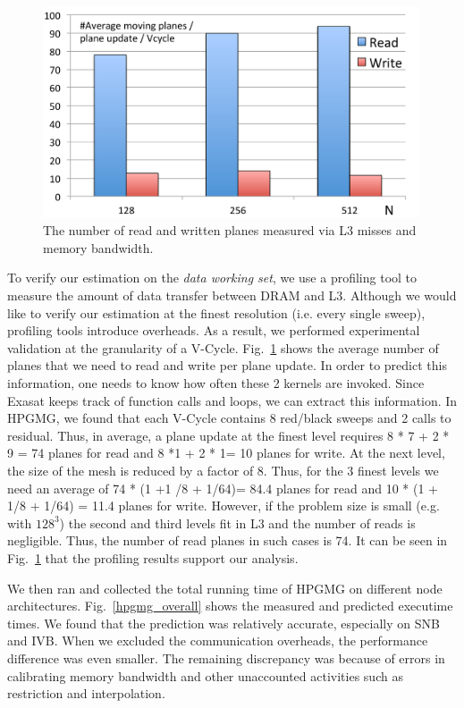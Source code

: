 \documentclass{article}
\begin{document}
\begin{figure}[htp]
\centering
\includegraphics[width=0.99\textwidth]{hpgmg_dram}
\caption{The number of read and written planes measured via L3 misses and memory bandwidth.}
\label{hpgmg_dram}
\end{figure}

To verify our estimation on the {\em data working set}, we use a profiling tool to measure the amount of data transfer between DRAM and L3.
Although we would like to verify our estimation at the finest resolution (i.e. every single sweep), profiling tools introduce overheads.
As a result, we performed experimental validation at the granularity of a V-Cycle.
Fig.~\ref{hpgmg_dram} shows the average number of planes that we need to read and write per plane update.
In order to predict this information, one needs to know how often these 2 kernels are invoked.
Since Exasat keeps track of function calls and loops, we can extract this information.
In HPGMG, we found that each V-Cycle contains 8 red/black sweeps and 2 calls to residual.
Thus, in average, a plane update at the finest level requires 8 * 7 + 2 * 9 = 74 planes for read and 8 *1 + 2 * 1= 10 planes for write. 
At the next level, the size of the mesh is reduced by a factor of 8.
Thus, for the 3 finest levels we need an average of 74 * (1 +1 /8 + 1/64)= 84.4 planes for read and 10 * (1 + 1/8 + 1/64) = 11.4 planes for write.
However, if the problem size is small (e.g. with $128^3$) the second and third levels fit in L3 and the number of reads is negligible.
Thus, the number of read planes in such cases is 74.
It can be seen in Fig.~\ref{hpgmg_dram} that the profiling results support our analysis. 

We then ran and collected the total running time of HPGMG on different node architectures.
Fig.~\ref{hpgmg_overall} shows the measured and predicted executime times. 
We found that the prediction was relatively accurate, especially on SNB and IVB.
When we excluded the communication overheads, the performance difference was even smaller.
The remaining discrepancy was because of errors in calibrating memory bandwidth and other unaccounted activities such as restriction and interpolation.
\end{document}
